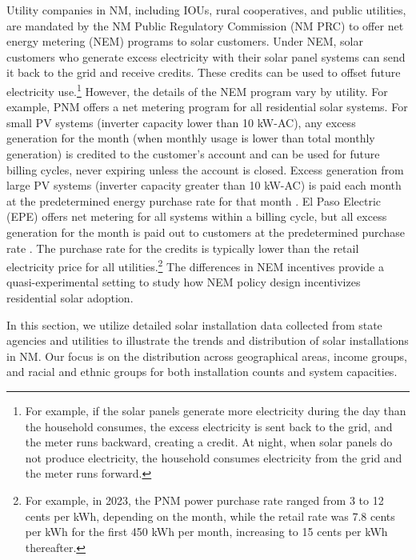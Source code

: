 \documentclass[12pt,twoside,letterpaper]{article}
\begin{document}
Utility companies in NM, including IOUs, rural cooperatives, and public utilities, are mandated by the NM Public Regulatory Commission (NM PRC) to offer net energy metering (NEM) programs to solar customers. Under NEM, solar customers who generate excess electricity with their solar panel systems can send it back to the grid and receive credits. These credits can be used to offset future electricity use.\footnote{For example, if the solar panels generate more electricity during the day than the household consumes, the excess electricity is sent back to the grid, and the meter runs backward, creating a credit. At night, when solar panels do not produce electricity, the household consumes electricity from the grid and the meter runs forward.} However, the details of the NEM program vary by utility. For example, PNM offers a net metering program for all residential solar systems. For small PV systems (inverter capacity lower than 10 kW-AC), any excess generation for the month (when monthly usage is lower than total monthly generation) is credited to the customer’s account and can be used for future billing cycles, never expiring unless the account is closed. Excess generation from large PV systems (inverter capacity greater than 10 kW-AC) is paid each month at the predetermined energy purchase rate for that month \parencite{pnmnet}. El Paso Electric (EPE) offers net metering for all systems within a billing cycle, but all excess generation for the month is paid out to customers at the predetermined purchase rate \parencite{epenet, epenetmid}. The purchase rate for the credits is typically lower than the retail electricity price for all utilities.\footnote{For example, in 2023, the PNM power purchase rate ranged from 3 to 12 cents per kWh, depending on the month, while the retail rate was 7.8 cents per kWh for the first 450 kWh per month, increasing to 15 cents per kWh thereafter.} The differences in NEM incentives provide a quasi-experimental setting to study how NEM policy design incentivizes residential solar adoption. 


In this section, we utilize detailed solar installation data collected from state agencies and utilities to illustrate the trends and distribution of solar installations in NM. Our focus is on the distribution across geographical areas, income groups, and racial and ethnic groups for both installation counts and system capacities.
\end{document}
